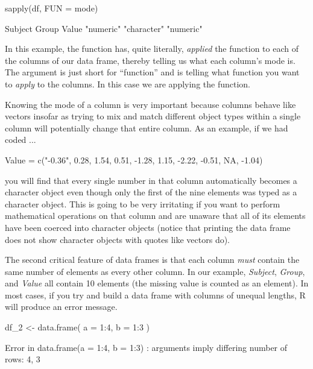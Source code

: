 \begin{inR}
sapply(df, FUN = mode) 
\end{inR}

\begin{outR}
     Subject       Group       Value 
  "numeric" "character"   "numeric"    
\end{outR}

In this example, the  function has, quite literally, \textit{applied} the function  to each of the columns of our data frame, thereby telling us what each column's mode is. The argument  is just short for ``function'' and is telling  what function you want to \textit{apply} to the columns. In this case we are applying the  function. 

Knowing the mode of a column is very important because columns behave like vectors insofar as trying to mix and match different object types within a single column will potentially change that entire column.  As an example, if we had coded ... 

\begin{inR}
Value = c("-0.36", 0.28, 1.54, 0.51, -1.28, 1.15, -2.22, -0.51, NA, -1.04)
\end{inR}

\vspace{1em}

\noindent
you will find that every single number in that column automatically becomes a character object even though only the first of the nine elements was typed as a character object. This is going to be very irritating if you want to perform mathematical operations on that column and are unaware that all of its elements have been coerced into character objects (notice that printing the data frame does not show character objects with quotes like vectors do).

The second critical feature of data frames is that each column \textit{must} contain the same number of elements as every other column.  In our example, \textit{Subject}, \textit{Group}, and \textit{Value} all contain 10 elements (the missing value is counted as an element).  In most cases, if you try and build a data frame with columns of unequal lengths, R will produce an error message. 

\begin{inR}
df_2 <- data.frame(
  a = 1:4,
  b = 1:3
)
\end{inR}
\begin{outR}
Error in data.frame(a = 1:4, b = 1:3) : 
  arguments imply differing number of rows: 4, 3
\end{outR}

